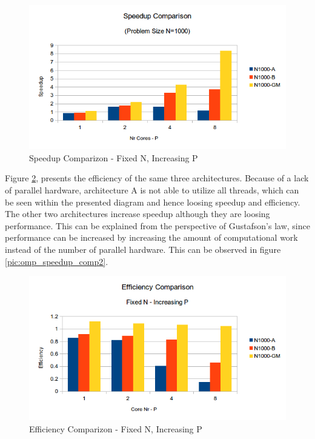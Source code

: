 \documentclass[conference]{IEEEtran}
\begin{document}
\begin{figure}[h]
  \centering
  \includegraphics[scale=0.55]{pic/omp_speedup_comp.png} 
  \caption{Speedup Comparizon - Fixed N, Increasing P}
  \label{pic:omp_speedup_comp}
\end{figure}

Figure \ref{pic:omp_efficiency_comp}, presents the efficiency of the same three architectures. Because of a lack of parallel hardware, architecture A is not able to utilize all threads, which can be seen within the presented diagram and hence loosing speedup and efficiency. The other two architectures increase speedup although they are loosing performance. This can be explained from the perspective of Gustafson’s law, since performance can be increased by increasing the amount of computational work instead of the number of parallel hardware. This can be observed in figure \ref{pic:omp_speedup_comp2}. 

\begin{figure}[h]
  \centering
  \includegraphics[scale=0.55]{pic/omp_efficiency_comp.png} 
  \caption{Efficiency Comparizon - Fixed N, Increasing P}
  \label{pic:omp_efficiency_comp}
\end{figure}
\end{document}
